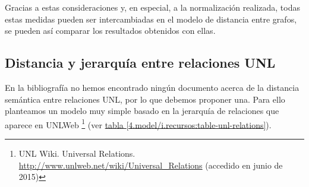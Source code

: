 \documentclass[a4paper,12pt,spanish]{book}
\begin{document}
Gracias a estas consideraciones y, en especial, a la normalización realizada,
todas estas medidas pueden ser intercambiadas en el modelo de distancia entre grafos,
se pueden así comparar los resultados obtenidos con ellas.


\subsection{Distancia y jerarquía entre relaciones UNL}
\label{4.model/i.recursos:distancia-y-jerarquia-entre-relaciones-unl}
En la bibliografía no hemos encontrado ningún documento acerca de la distancia semántica entre
relaciones UNL, por lo que debemos proponer una. Para ello planteamos un modelo muy simple
basado en la jerarquía de relaciones que aparece en UNLWeb \footnote{
UNL Wiki. Universal Relations. \href{http://www.unlweb.net/wiki/Universal\_Relations}{http://www.unlweb.net/wiki/Universal\_Relations}
(accedido en junio de 2015)
} (ver \hyperref[4.model/i.recursos:table-unl-relations]{tabla  \ref*{4.model/i.recursos:table-unl-relations}}).
\end{document}
